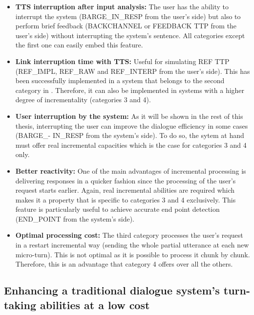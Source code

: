                 \begin{itemize}
                  \item \textbf{TTS interruption after input analysis:} The user has the ability to interrupt the system (BARGE\_IN\_RESP from the user's side) but also to perform brief feedback (BACKCHANNEL or FEEDBACK TTP from the user's side) without interrupting the system's sentence. All categories except the first one can easily embed this feature.
                  \item \textbf{Link interruption time with TTS:} Useful for simulating REF TTP (REF\_IMPL, REF\_RAW and REF\_INTERP from the user's side). This has been successfully implemented in a system that belongs to the second category in \cite{El-Asri2014a}. Therefore, it can also be implemented in systems with a higher degree of incrementality (categories 3 and 4).
                  \item \textbf{User interruption by the system:} As it will be shown in the rest of this thesis, interrupting the user can improve the dialogue efficiency in some cases (BARGE\_- IN\_RESP from the system's side). To do so, the sytem at hand must offer real incremental capacities which is the case for categories 3 and 4 only.
                  \item \textbf{Better reactivity:} One of the main advantages of incremental processing is delivering responses in a quicker fashion since the processing of the user's request starts earlier. Again, real incremental abilities are required which makes it a property that is specific to categories 3 and 4 exclusively. This feature is particularly useful to achieve accurate end point detection (END\_POINT from the system's side).
                  \item \textbf{Optimal processing cost:} The third category processes the user's request in a restart incremental way (sending the whole partial utterance at each new micro-turn). This is not optimal as it is possible to process it chunk by chunk. Therefore, this is an advantage that category 4 offers over all the others.
                \end{itemize}

	\subsection{Enhancing a traditional dialogue system's turn-taking abilities at a low cost}
    
